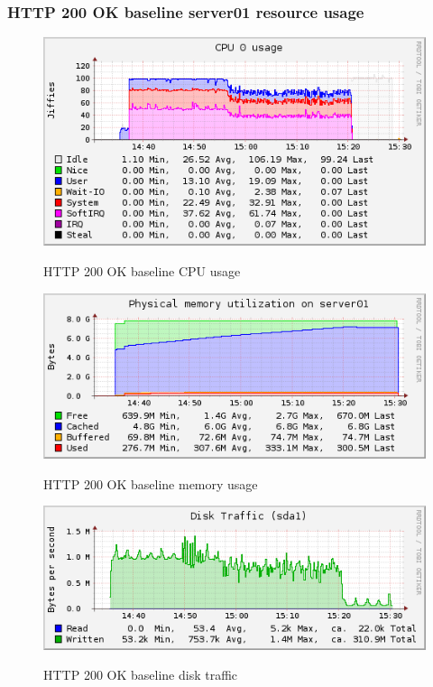 \documentclass[Measurement results]{subfiles}
\begin{document}
\subsubsection{HTTP 200 OK baseline server01 resource usage}
\label{sec:HTTP 200 OK baseline server01 resource usage}
\begin{figure}[H]
\centering
\caption{HTTP 200 OK baseline CPU usage}
\includegraphics[scale=0.7]{images/results/baseline_200/cpu.png}
\label{fig:Baseline Nginx CPU usage}
\end{figure}

\begin{figure}[H]
\centering
\caption{HTTP 200 OK baseline memory usage}
\includegraphics[scale=0.7]{images/results/baseline_200/memory.png}
\label{fig:Baseline Nginx memory usage}
\end{figure}

\begin{figure}[H]
\centering
\caption{HTTP 200 OK baseline disk traffic}
\includegraphics[scale=0.7]{images/results/baseline_200/disk.png}
\label{fig:Baseline Nginx disk traffic}
\end{figure}
\end{document}
